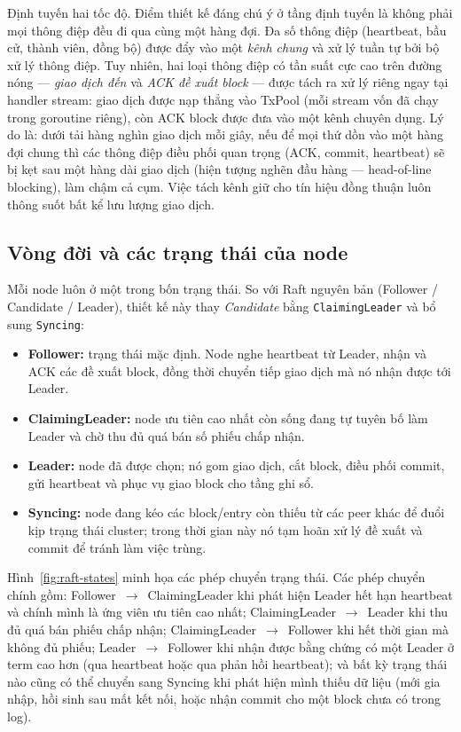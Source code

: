 Định tuyến hai tốc độ. Điểm thiết kế đáng chú ý ở tầng định tuyến là
không phải mọi thông điệp đều đi qua cùng một hàng đợi. Đa số thông điệp (heartbeat,
bầu cử, thành viên, đồng bộ) được đẩy vào một \textit{kênh chung} và xử lý tuần tự
bởi bộ xử lý thông điệp. Tuy nhiên, hai loại thông điệp có tần suất cực cao trên
đường nóng --- \textit{giao dịch đến} và \textit{ACK đề xuất block} --- được tách
ra xử lý riêng ngay tại handler stream: giao dịch được nạp thẳng vào TxPool (mỗi
stream vốn đã chạy trong goroutine riêng), còn ACK block được đưa vào một kênh
chuyên dụng. Lý do là: dưới tải hàng nghìn giao dịch mỗi giây, nếu để mọi thứ dồn
vào một hàng đợi chung thì các thông điệp điều phối quan trọng (ACK, commit,
heartbeat) sẽ bị kẹt sau một hàng dài giao dịch (hiện tượng nghẽn đầu hàng ---
head-of-line blocking), làm chậm cả cụm. Việc tách kênh giữ cho tín hiệu đồng
thuận luôn thông suốt bất kể lưu lượng giao dịch.

\subsection{Vòng đời và các trạng thái của node}
\label{sec:ordering-states}

Mỗi node luôn ở một trong bốn trạng thái. So với Raft nguyên bản (Follower /
Candidate / Leader), thiết kế này thay \textit{Candidate} bằng
\texttt{ClaimingLeader} và bổ sung \texttt{Syncing}:

\begin{itemize}
  \item \textbf{Follower:} trạng thái mặc định. Node nghe heartbeat từ Leader,
  nhận và ACK các đề xuất block, đồng thời chuyển tiếp giao dịch mà nó nhận được
  tới Leader.
  \item \textbf{ClaimingLeader:} node ưu tiên cao nhất còn sống đang tự tuyên bố
  làm Leader và chờ thu đủ quá bán số phiếu chấp nhận.
  \item \textbf{Leader:} node đã được chọn; nó gom giao dịch, cắt block, điều phối
  commit, gửi heartbeat và phục vụ giao block cho tầng ghi sổ.
  \item \textbf{Syncing:} node đang kéo các block/entry còn thiếu từ các peer khác
  để đuổi kịp trạng thái cluster; trong thời gian này nó tạm hoãn xử lý đề xuất và
  commit để tránh làm việc trùng.
\end{itemize}

Hình~\ref{fig:raft-states} minh họa các phép chuyển trạng thái. Các phép chuyển
chính gồm: Follower~$\rightarrow$~ClaimingLeader khi phát hiện Leader hết hạn
heartbeat và chính mình là ứng viên ưu tiên cao nhất;
ClaimingLeader~$\rightarrow$~Leader khi thu đủ quá bán phiếu chấp nhận;
ClaimingLeader~$\rightarrow$~Follower khi hết thời gian mà không đủ phiếu;
Leader~$\rightarrow$~Follower khi nhận được bằng chứng có một Leader ở term cao
hơn (qua heartbeat hoặc qua phản hồi heartbeat); và bất kỳ trạng thái nào cũng có
thể chuyển sang Syncing khi phát hiện mình thiếu dữ liệu (mới gia nhập, hồi sinh
sau mất kết nối, hoặc nhận commit cho một block chưa có trong log).

